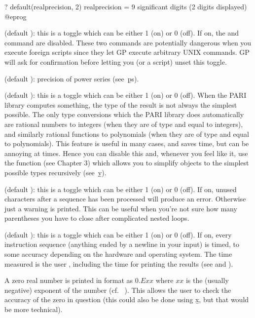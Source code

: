 \bprog
? default(realprecision, 2)
      realprecision = 9 significant digits (2 digits displayed)
@eprog

 (default ): this is a toggle which can be either 1
(on) or 0 (off). If on, the  and  command are
disabled. These two commands are potentially dangerous when you execute
foreign scripts since they let GP execute arbitrary UNIX commands. GP will
ask for confirmation before letting you (or a script) unset this toggle.

 (default ): precision of power series
(see~\b{ps}).

 (default ): this is a toggle which can be either
1 (on) or 0 (off). When the PARI library computes something, the type of the
result is not always the simplest possible. The only type conversions which
the PARI library does automatically are rational numbers to integers (when
they are of type  and equal to integers), and similarly rational
functions to polynomials (when they are of type  and equal to
polynomials). This feature is useful in many cases, and saves time, but can
be annoying at times. Hence you can disable this and, whenever you feel like
it, use the function  (see Chapter 3) which allows you to
simplify objects to the simplest possible types recursively (see~\b{y}).

 (default ): this is a toggle which can be
either 1 (on) or 0 (off). If on, unused characters after a sequence has been
processed will produce an error. Otherwise just a warning is printed. This
can be useful when you're not sure how many parentheses you have to close after
complicated nested loops.

 (default ): this is a toggle which can be either 1
(on) or 0 (off). If on, every instruction sequence (anything ended by a
newline in your input) is timed, to some accuracy depending on the hardware
and operating system. The time measured is the user ,
 including the time for printing the results (see \kbd{\#} and
\kbd{\#\#}).


\noindent
A zero real number is printed in  format as $0.Exx$ where $xx$ is
the (usually negative)  exponent of the number (cf.\ %
). This allows the user to check the accuracy of the zero
in question (this could also be done using \b{x}, but that would be more
technical).

